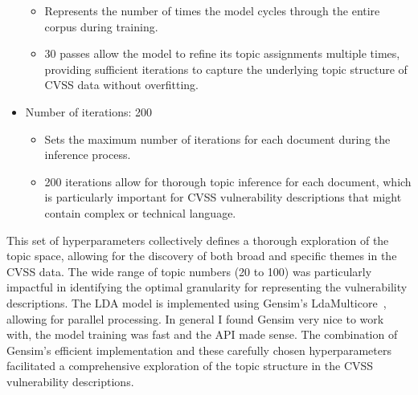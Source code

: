 \documentclass[12pt]{article}
\begin{document}
\begin{itemize}
	      \begin{itemize}

		      \item Represents the number of times the model cycles through the entire corpus during
		            training.

		      \item 30 passes allow the model to refine its topic assignments multiple times,
		            providing sufficient iterations to capture the underlying topic structure of CVSS
		            data without overfitting.

	      \end{itemize}

	\item Number of iterations: {200}

	      \begin{itemize}

		      \item Sets the maximum number of iterations for each document during the inference
		            process.

		      \item 200 iterations allow for thorough topic inference for each document, which is
		            particularly important for CVSS vulnerability descriptions that might contain
		            complex or technical language.

	      \end{itemize}

\end{itemize}

This set of hyperparameters collectively defines a thorough exploration of the topic space, allowing
for the discovery of both broad and specific themes in the CVSS data. The wide range of topic
numbers (20 to 100) was particularly impactful in identifying the optimal granularity for
representing the vulnerability descriptions. The LDA model is implemented using Gensim's
LdaMulticore~\cite{gensim}, allowing for parallel processing. In general I found Gensim very nice to
work with, the model training was fast and the API made sense. The combination of Gensim's efficient
implementation and these carefully chosen hyperparameters facilitated a comprehensive exploration of
the topic structure in the CVSS vulnerability descriptions.

\end{document}

